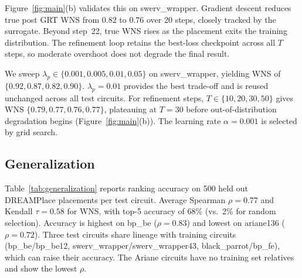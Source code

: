 \documentclass[sigconf,anonymous,review,9pt]{acmart}
\begin{document}
Figure~\ref{fig:main}(b) validates this on swerv\_wrapper. Gradient
descent reduces true post GRT WNS from $0.82$ to $0.76$ over 20
steps, closely tracked by the surrogate. Beyond step~22, true WNS
rises as the placement exits the training distribution. The
refinement loop retains the best-loss checkpoint across all $T$
steps, so moderate overshoot does not degrade the final result.

We sweep $\lambda_p \in \{0.001, 0.005, 0.01, 0.05\}$ on
swerv\_wrapper, yielding WNS of $\{0.92, 0.87, 0.82, 0.90\}$.
$\lambda_p = 0.01$ provides the best trade-off and is reused
unchanged across all test circuits.
For refinement steps, $T \in \{10, 20, 30, 50\}$ gives WNS
$\{0.79, 0.77, 0.76, 0.77\}$, plateauing at $T{=}30$ before
out-of-distribution degradation begins (Figure~\ref{fig:main}(b)).
The learning rate $\alpha{=}0.001$ is selected by grid search.

\subsection{Generalization}
\label{subsec:generalization}

Table~\ref{tab:generalization} reports ranking accuracy on 500
held out DREAMPlace placements per test circuit. Average Spearman
$\rho = 0.77$ and Kendall $\tau = 0.58$ for WNS, with top-5 accuracy
of 68\% (vs.\ 2\% for random selection). Accuracy is highest on
bp\_be ($\rho = 0.83$) and lowest on ariane136 ($\rho = 0.72$).
Three test circuits share lineage with training circuits
(bp\_be/bp\_be12, swerv\_wrapper/swerv\_wrapper43, black\_parrot/bp\_fe),
which can raise their accuracy. The Ariane circuits have no
training set relatives and show the lowest $\rho$.
\end{document}

